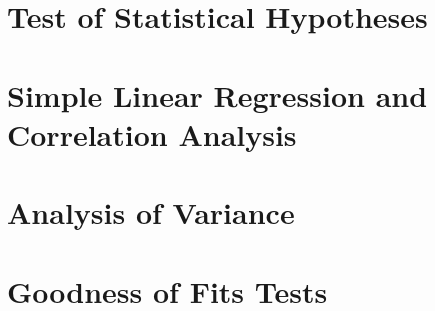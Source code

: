 \documentclass[a4paper, 10pt]{scrbook}  %
\begin{document}
\chapter{Test of Statistical Hypotheses}

\chapter{Simple Linear Regression and Correlation Analysis}

\chapter{Analysis of Variance}

\chapter{Goodness of Fits Tests}

\end{document}
